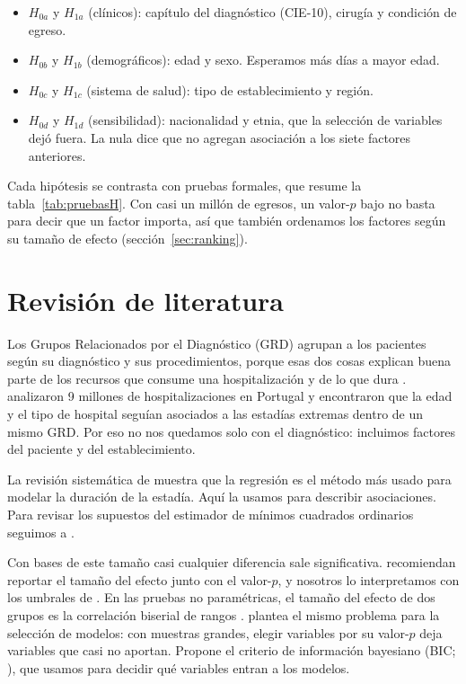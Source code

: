 \documentclass[10.5pt,a4paper,headings=small,abstract=false,bibliography=totoc,listof=totoc]{scrartcl}
\newcommand{\cie}{\mbox{CIE-10}}
\begin{document}
\begin{itemize}\setlength\itemsep{0pt}
\item $H_{0a}$ y $H_{1a}$ (clínicos): capítulo del diagnóstico (\cie), cirugía y condición de egreso.
\item $H_{0b}$ y $H_{1b}$ (demográficos): edad y sexo. Esperamos más días a mayor edad.
\item $H_{0c}$ y $H_{1c}$ (sistema de salud): tipo de establecimiento y región.
\item $H_{0d}$ y $H_{1d}$ (sensibilidad): nacionalidad y etnia, que la selección de variables dejó fuera. La nula dice que no agregan asociación a los siete factores anteriores.
\end{itemize}

Cada hipótesis se contrasta con pruebas formales, que resume la tabla~\ref{tab:pruebasH}. Con casi un millón de egresos, un valor-$p$ bajo no basta para decir que un factor importa, así que también ordenamos los factores según su tamaño de efecto (sección~\ref{sec:ranking}).

\section{Revisión de literatura}

Los Grupos Relacionados por el Diagnóstico (GRD) agrupan a los pacientes según su diagnóstico y sus procedimientos, porque esas dos cosas explican buena parte de los recursos que consume una hospitalización y de lo que dura \citep{fetter1980}. \citet{freitas2012} analizaron 9 millones de hospitalizaciones en Portugal y encontraron que la edad y el tipo de hospital seguían asociados a las estadías extremas dentro de un mismo GRD. Por eso no nos quedamos solo con el diagnóstico: incluimos factores del paciente y del establecimiento.

La revisión sistemática de \citet{lequertier2021} muestra que la regresión es el método más usado para modelar la duración de la estadía. Aquí la usamos para describir asociaciones. Para revisar los supuestos del estimador de mínimos cuadrados ordinarios seguimos a \citet{rodriguez2017}.

Con bases de este tamaño casi cualquier diferencia sale significativa. \citet{lin2013} recomiendan reportar el tamaño del efecto junto con el valor-$p$, y nosotros lo interpretamos con los umbrales de \citet{cohen1988}. En las pruebas no paramétricas, el tamaño del efecto de dos grupos es la correlación biserial de rangos \citep{kerby2014}. \citet{raftery1995} plantea el mismo problema para la selección de modelos: con muestras grandes, elegir variables por su valor-$p$ deja variables que casi no aportan. Propone el criterio de información bayesiano (BIC; \citealt{schwarz1978}), que usamos para decidir qué variables entran a los modelos.
\end{document}
